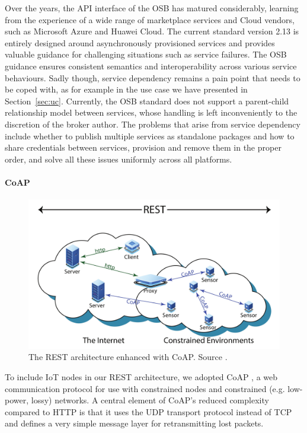 Over the years, the API interface of the OSB has matured considerably, learning from the experience of a wide range of marketplace services and Cloud vendors, such as Microsoft Azure and Huawei Cloud. The current standard version 2.13 is entirely designed around asynchronously provisioned services and provides valuable guidance for challenging situations such as service failures. 
The OSB guidance ensures consistent semantics and interoperability across various service behaviours.
Sadly though, service dependency remains a pain point that needs to be coped with, as for example in the use case we have presented in Section~\ref{sec:uc}. 
Currently, the OSB standard does not support a parent-child relationship model between services, whose handling is left inconveniently to the discretion of the broker author. 
The problems that arise from service dependency include whether to publish multiple services as standalone packages and how to share credentials between services, provision and remove them in the proper order, and solve all these issues uniformly across all platforms.

\paragraph{CoAP}\label{sec:coap}

\begin{figure}[ht]
\centering
\includegraphics[width=\columnwidth]{figures/coap}
\caption{The REST architecture enhanced with CoAP. Source \cite{bormann2012coap}.}
\label{fig:coap}
\end{figure}

To include IoT nodes in our REST architecture, we adopted CoAP \cite{bormann2012coap}, a web communication protocol for use with constrained nodes and constrained (e.g. low-power, lossy) networks. A central element of CoAP's reduced complexity compared to HTTP is that it uses the UDP transport protocol instead of TCP and defines a very simple message layer for retransmitting lost packets.

